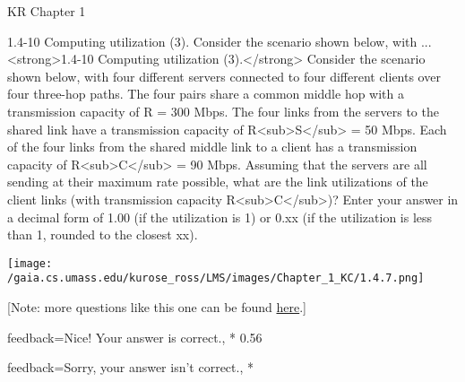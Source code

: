 \documentclass[a4paper]{article}
\begin{document}
\begin{quiz}{KR Chapter 1}
\begin{shortanswer}[
	points=1,
	penalty=0.33333,
]{1.4-10 Computing utilization (3). Consider the scenario shown below, with ...}
<strong>1.4-10 Computing utilization (3).</strong> Consider the scenario shown below, with four different servers connected to four different clients over four three-hop paths. The four pairs share a common middle hop with a transmission capacity of R = 300 Mbps. The four links from the servers to the shared link have a transmission capacity of R<sub>S</sub> = 50 Mbps. Each of the four links from the shared middle link to a client has a transmission capacity of R<sub>C</sub> = 90 Mbps. Assuming that the servers are all sending at their maximum rate possible, what are the link utilizations of the client links (with transmission capacity R<sub>C</sub>)? Enter your answer in a decimal form of 1.00 (if the utilization is 1) or 0.xx (if the utilization is less than 1, rounded to the closest xx). 
\begin{center}
\texttt{[image: /gaia.cs.umass.edu/kurose\_ross/LMS/images/Chapter\_1\_KC/1.4.7.png]}
\end{center}
 [Note: more questions like this one can be found \href{http://gaia.cs.umass.edu/kurose_ross/interactive/end-end-throughput-simple.php}{here}.]
\item[feedback={Nice!  Your answer is correct.},]* 0.56
\item[feedback={Sorry, your answer isn't correct.},] *
\end{shortanswer}

\end{quiz}
\end{document}
